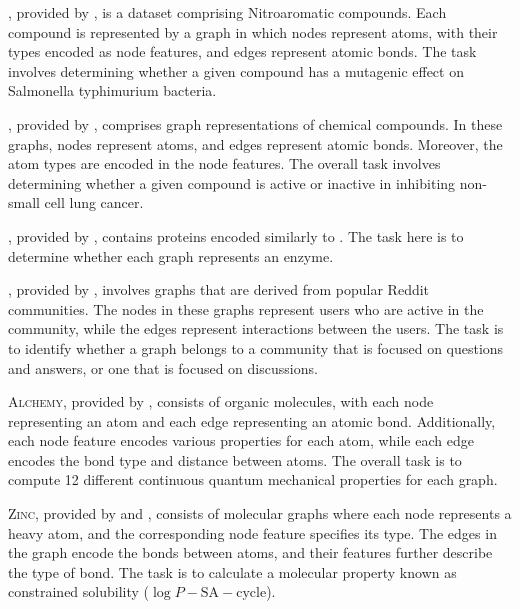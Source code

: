\mutag, provided by \cite{Debnath1991}, is a dataset comprising Nitroaromatic compounds. Each compound is represented by a graph in which nodes represent atoms, with their types encoded as node features, and edges represent atomic bonds. The task involves determining whether a given compound has a mutagenic effect on Salmonella typhimurium bacteria. \newline

\nci, provided by \cite{Wale2008}, comprises graph representations of chemical compounds. In these graphs, nodes represent atoms, and edges represent atomic bonds. Moreover, the atom types are encoded in the node features. The overall task involves determining whether a given compound is active or inactive in inhibiting non-small cell lung cancer.\newline

\proteins, provided by \cite{Borgwardt2005}, contains proteins encoded similarly to \enzymes. The task here is to determine whether each graph represents an enzyme. \newline

\reddit, provided by \cite{Yanardag2015}, involves graphs that are derived from popular Reddit communities. The nodes in these graphs represent users who are active in the community, while the edges represent interactions between the users. The task is to identify whether a graph belongs to a community that is focused on questions and answers, or one that is focused on discussions. \newline

\textsc{Alchemy}, provided by \cite{Chen2019alchemy}, consists of organic molecules, with each node representing an atom and each edge representing an atomic bond. Additionally, each node feature encodes various properties for each atom, while each edge encodes the bond type and distance between atoms. The overall task is to compute 12 different continuous quantum mechanical properties for each graph. \newline

\textsc{Zinc}, provided by \cite{Bresson2019} and \cite{Irwin2012}, consists of molecular graphs where each node represents a heavy atom, and the corresponding node feature specifies its type. The edges in the graph encode the bonds between atoms, and their features further describe the type of bond. The task is to calculate a molecular property known as constrained solubility ($\log P - \text{SA} - \text{cycle}$).\newline

